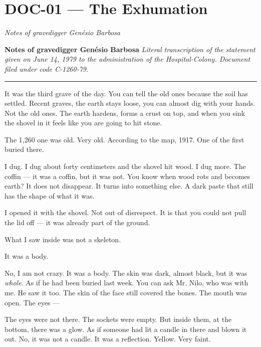 \section*{\textbf{DOC-01} --- The Exhumation}

\noindent \textit{Notes of gravedigger Genésio Barbosa}

\noindent \textbf{Notes of gravedigger Genésio Barbosa}
\textit{Literal transcription of the statement given on June 14, 1979 to the administration of the Hospital-Colony. Document filed under code C-1260-79.}

\vspace{0.5em}\noindent\rule{\textwidth}{0.5pt}\vspace{0.5em}

\noindent It was the third grave of the day. You can tell the old ones because the soil has settled. Recent graves, the earth stays loose, you can almost dig with your hands. Not the old ones. The earth hardens, forms a crust on top, and when you sink the shovel in it feels like you are going to hit stone.

\noindent The 1,260 one was old. Very old. According to the map, 1917. One of the first buried there.

\noindent I dug. I dug about forty centimeters and the shovel hit wood. I dug more. The coffin --- it was a coffin, but it was not. You know when wood rots and becomes earth? It does not disappear. It turns into something else. A dark paste that still has the shape of what it was.

\noindent I opened it with the shovel. Not out of disrespect. It is that you could not pull the lid off --- it was already part of the ground.

\noindent What I saw inside was not a skeleton.

\noindent It was a body.

\noindent No, I am not crazy. It was a body. The skin was dark, almost black, but it was \textit{whole}. As if he had been buried last week. You can ask Mr. Nilo, who was with me. He saw it too. The skin of the face still covered the bones. The mouth was open. The eyes ---

\noindent The eyes were not there. The sockets were empty. But inside them, at the bottom, there was a glow. As if someone had lit a candle in there and blown it out. No, it was not a candle. It was a reflection. Yellow. Very faint.

